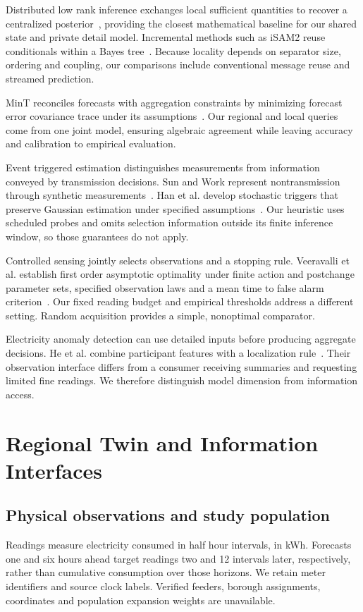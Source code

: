 \documentclass[conference]{IEEEtran}
\begin{document}
Distributed low rank inference exchanges local sufficient quantities to recover a centralized posterior~\cite{distributed}, providing the closest mathematical baseline for our shared state and private detail model. Incremental methods such as iSAM2 reuse conditionals within a Bayes tree~\cite{isam}. Because locality depends on separator size, ordering and coupling, our comparisons include conventional message reuse and streamed prediction.

MinT reconciles forecasts with aggregation constraints by minimizing forecast error covariance trace under its assumptions~\cite{mint}. Our regional and local queries come from one joint model, ensuring algebraic agreement while leaving accuracy and calibration to empirical evaluation.

Event triggered estimation distinguishes measurements from information conveyed by transmission decisions. Sun and Work represent nontransmission through synthetic measurements~\cite{sun}. Han et al. develop stochastic triggers that preserve Gaussian estimation under specified assumptions~\cite{han}. Our heuristic uses scheduled probes and omits selection information outside its finite inference window, so those guarantees do not apply.

Controlled sensing jointly selects observations and a stopping rule. Veeravalli et al. establish first order asymptotic optimality under finite action and postchange parameter sets, specified observation laws and a mean time to false alarm criterion~\cite{controlled}. Our fixed reading budget and empirical thresholds address a different setting. Random acquisition provides a simple, nonoptimal comparator.

Electricity anomaly detection can use detailed inputs before producing aggregate decisions. He et al. combine participant features with a localization rule~\cite{he}. Their observation interface differs from a consumer receiving summaries and requesting limited fine readings. We therefore distinguish model dimension from information access.




\section{Regional Twin and Information Interfaces}
\subsection{Physical observations and study population}
Readings measure electricity consumed in half hour intervals, in kWh. Forecasts one and six hours ahead target readings two and 12 intervals later, respectively, rather than cumulative consumption over those horizons. We retain meter identifiers and source clock labels. Verified feeders, borough assignments, coordinates and population expansion weights are unavailable.
\end{document}
